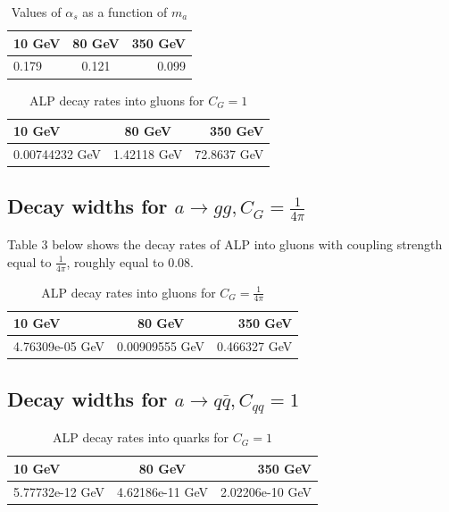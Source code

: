 \documentclass[12pt,a4paper]{article}
\begin{document}
\begin{table}
\begin{center}
\label{tab : table1}
\begin{tabular}{l|c|r}
\hline
\textbf{10 GeV} & \textbf{80 GeV} & \textbf{350 GeV} \\
\hline
0.179 &  0.121 &  0.099 \\
\hline
\end{tabular}
\caption{Values of $\alpha_s$ as a function of $m_a$}
\end{center}
\end{table}


\begin{table}[h!]
\begin{center}
\label{tab : table2}
\begin{tabular}{l|c|r}
\hline
\textbf{10 GeV} & \textbf{80 GeV} & \textbf{350 GeV} \\
\hline
0.00744232 GeV & 1.42118 GeV & 72.8637 GeV \\
\hline
\end{tabular}
\caption{ALP decay rates into gluons for $C_G =1$}
\end{center}
\end{table} 


\subsection{Decay widths for $a \rightarrow g g, C_G = \frac{1}{4\pi}$}
Table 3 below shows the  decay rates of ALP into gluons with coupling strength equal to $\frac{1}{4\pi}$, roughly equal to 0.08.

\begin{table}[h!]
\begin{center}
\label{tab : table3}
\begin{tabular}{l|c|r}
\hline
\textbf{10 GeV} & \textbf{80 GeV} & \textbf{350 GeV} \\
\hline
4.76309e-05 GeV & 0.00909555 GeV  & 0.466327 GeV \\
\hline
\end{tabular}
\caption{ALP decay rates into gluons for $C_G =\frac{1}{4\pi}$}
\end{center}
\end{table}

\subsection{Decay widths for $a \rightarrow q \bar{q}, C_{qq} = 1$}
\begin{table}[h!]
\begin{center}
\label{tab : table4}
\begin{tabular}{l|c|r}
\hline
\textbf{10 GeV} & \textbf{80 GeV} & \textbf{350 GeV} \\
\hline
5.77732e-12 GeV & 4.62186e-11 GeV  & 2.02206e-10 GeV \\
\hline
\end{tabular}
\caption{ALP decay rates into quarks for $C_G = 1$}
\end{center}
\end{table}
\end{document}
